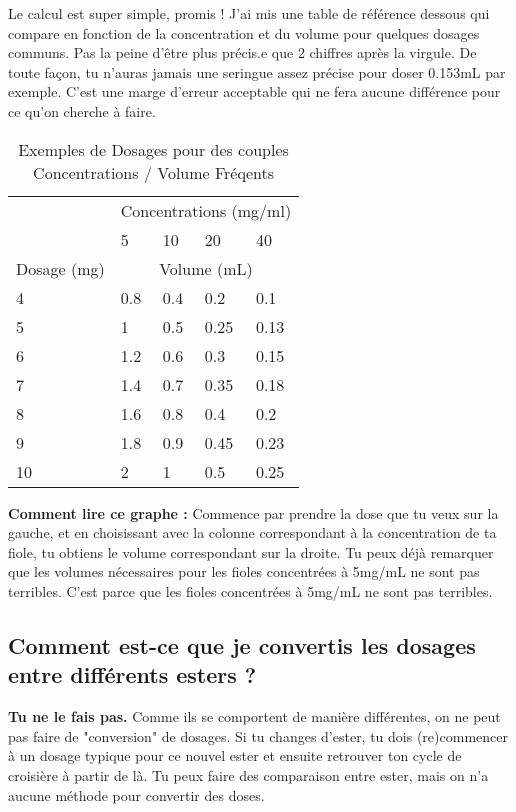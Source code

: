 \documentclass{article}
\begin{document}
Le calcul est super simple, promis ! J'ai mis une table de référence dessous qui compare en fonction de la concentration et du volume pour quelques dosages communs. Pas la peine d'être plus précis.e que 2 chiffres après la virgule. De toute façon, tu n'auras jamais une seringue assez précise pour doser 0.153mL par exemple. C'est une marge d'erreur acceptable qui ne fera aucune différence pour ce qu'on cherche à faire.

\begin{table}[]
\centering
\caption{Exemples de Dosages pour des couples Concentrations / Volume Fréqents}
\label{tab:concentrations}
\begin{tabular}{@{}lllll@{}}
    \toprule
    \multicolumn{1}{c}{} & \multicolumn{4}{c}{Concentrations (mg/ml)} \\
    \cmidrule(rl){2-5}
            & 5    & 10  & 20 & 40    \\
            \cmidrule(rl){2-5}
Dosage (mg) & \multicolumn{4}{c}{Volume (mL)}  \\
    \cmidrule(r){1-1} \cmidrule(lr){2-5} 
4        & 0.8  & 0.4 & 0.2  & 0.1      \\
5        & 1    & 0.5 & 0.25 & 0.13   \\
6        & 1.2  & 0.6   & 0.3  & 0.15     \\
7        & 1.4  & 0.7 & 0.35  & 0.18  \\
8        & 1.6  & 0.8   & 0.4  & 0.2    \\
9        & 1.8  & 0.9 & 0.45  & 0.23 \\
10       & 2    & 1   & 0.5  & 0.25   \\
    \bottomrule
\end{tabular}
\end{table}

\textbf{Comment lire ce graphe :} Commence par prendre la dose que tu veux sur la gauche, et en choisissant avec la colonne correspondant à la concentration de ta fiole, tu obtiens le volume correspondant sur la droite. Tu peux déjà remarquer que les volumes nécessaires pour les fioles concentrées à 5mg/mL ne sont pas terribles. C'est parce que les fioles concentrées à 5mg/mL ne sont pas terribles.

\subsection{Comment est-ce que je convertis les dosages entre différents esters ?}

\textbf{Tu ne le fais pas.} Comme ils se comportent de manière différentes, on ne peut pas faire de "conversion" de dosages. Si tu changes d'ester, tu dois (re)commencer à un dosage typique pour ce nouvel ester et ensuite retrouver ton cycle de croisière à partir de là. Tu peux faire des comparaison entre ester, mais on n'a aucune méthode pour convertir des doses.
\end{document}
